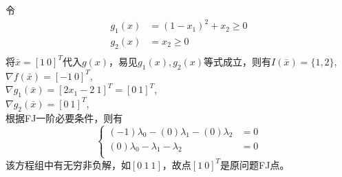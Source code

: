 \begin{solution}
    令
    \begin{align*}
        g_1(x)&=(1 - x_1)^2 + x_2\geq 0\\
        g_2(x)&=x_2\geq0\\
    \end{align*}
    将$\bar{x}=[1\ 0]^T$代入$g(x)$，易见$g_1(x),g_2(x)$等式成立，则有$I(\bar{x})=\{1,2\}$,\\
    $\nabla f(\bar{x})=[-1\ 0]^T$,\\
    $\nabla g_1(\bar{x})=[2x_1-2\ 1]^T=[0\ 1]^T$,\\
    $\nabla g_2(\bar{x})=[0\ 1]^T$,\\
    根据FJ一阶必要条件，则有
    $$\left\{
    \begin{aligned}
        (-1)\lambda_0 - (0)\lambda_1 - (0)\lambda_2 &=0\\
        (0)\lambda_0 - \lambda_1 - \lambda_2 &=0\\
    \end{aligned}\right.$$
    该方程组中有无穷非负解，如$[0\ 1\ 1]$，故点$[1\ 0]^T$是原问题FJ点。
\end{solution}